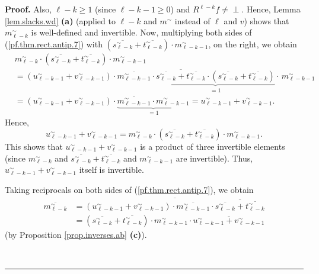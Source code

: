 \documentclass[numbers=enddot,12pt,final,onecolumn,notitlepage]{scrartcl}%
\theoremstyle{definition}
\newenvironment{verlong}{}{}
\newcommand{\undf}{\operatorname*{\bot}}
\newenvironment{proof}[1][Proof]{\noindent\textbf{#1.} }{\ \rule{0.5em}{0.5em}}
\begin{document}
\begin{verlong}
\begin{proof}
Also, $\ell-k\geq1$ (since $\ell-k-1\geq0$) and $R^{\ell-k}f\neq\undf$. Hence,
Lemma \ref{lem.slacks.wd} \textbf{(a)} (applied to $\ell-k$ and $m^{\sim}$
instead of $\ell$ and $v$) shows that $m_{\ell-k}^{\sim}$ is well-defined and
invertible. Now, multiplying both sides of (\ref{pf.thm.rect.antip.7}) with
$\left(  \overline{s_{\ell-k}^{\sim}}+\overline{t_{\ell-k}^{\sim}}\right)
\cdot m_{\ell-k-1}^{\sim}$, on the right, we obtain%
\begin{align*}
&  m_{\ell-k}^{\sim}\cdot\left(  \overline{s_{\ell-k}^{\sim}}+\overline
{t_{\ell-k}^{\sim}}\right)  \cdot m_{\ell-k-1}^{\sim}\\
&  =\left(  u_{\ell-k-1}^{\sim}+v_{\ell-k-1}^{\sim}\right)  \cdot
\overline{m_{\ell-k-1}^{\sim}}\cdot\underbrace{\overline{\overline{s_{\ell
-k}^{\sim}}+\overline{t_{\ell-k}^{\sim}}}\cdot\left(  \overline{s_{\ell
-k}^{\sim}}+\overline{t_{\ell-k}^{\sim}}\right)  }_{=1}\cdot\,m_{\ell
-k-1}^{\sim}\\
&  =\left(  u_{\ell-k-1}^{\sim}+v_{\ell-k-1}^{\sim}\right)  \cdot
\underbrace{\overline{m_{\ell-k-1}^{\sim}}\cdot m_{\ell-k-1}^{\sim}}%
_{=1}=u_{\ell-k-1}^{\sim}+v_{\ell-k-1}^{\sim}.
\end{align*}
Hence,%
\[
u_{\ell-k-1}^{\sim}+v_{\ell-k-1}^{\sim}=m_{\ell-k}^{\sim}\cdot\left(
\overline{s_{\ell-k}^{\sim}}+\overline{t_{\ell-k}^{\sim}}\right)  \cdot
m_{\ell-k-1}^{\sim}.
\]
This shows that $u_{\ell-k-1}^{\sim}+v_{\ell-k-1}^{\sim}$ is a product of
three invertible elements (since $m_{\ell-k}^{\sim}$ and $\overline{s_{\ell
-k}^{\sim}}+\overline{t_{\ell-k}^{\sim}}$ and $m_{\ell-k-1}^{\sim}$ are
invertible). Thus, $u_{\ell-k-1}^{\sim}+v_{\ell-k-1}^{\sim}$ itself is invertible.

Taking reciprocals on both sides of (\ref{pf.thm.rect.antip.7}), we obtain%
\begin{align}
\overline{m_{\ell-k}^{\sim}}  &  =\overline{\left(  u_{\ell-k-1}^{\sim
}+v_{\ell-k-1}^{\sim}\right)  \cdot\overline{m_{\ell-k-1}^{\sim}}%
\cdot\overline{\overline{s_{\ell-k}^{\sim}}+\overline{t_{\ell-k}^{\sim}}}%
}\nonumber\\
&  =\left(  \overline{s_{\ell-k}^{\sim}}+\overline{t_{\ell-k}^{\sim}}\right)
\cdot m_{\ell-k-1}^{\sim}\cdot\overline{u_{\ell-k-1}^{\sim}+v_{\ell-k-1}%
^{\sim}} \label{pf.thm.rect.antip.8}%
\end{align}
(by Proposition \ref{prop.inverses.ab} \textbf{(c)}).


\end{proof}
\end{verlong}
\end{document}

